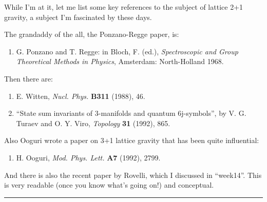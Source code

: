 \documentclass{article}
\def\tightlist{}
\renewcommand{\texttt}[1]{%
  \begingroup
  \ttfamily
  \begingroup\lccode`~=`/\lowercase{\endgroup\def~}{/\discretionary{}{}{}}%
  \begingroup\lccode`~=`[\lowercase{\endgroup\def~}{[\discretionary{}{}{}}%
  \begingroup\lccode`~=`.\lowercase{\endgroup\def~}{.\discretionary{}{}{}}%
  \catcode`/=\active\catcode`[=\active\catcode`.=\active
  \scantokens{#1\noexpand}%
  \endgroup
}
\begin{document}
While I'm at it, let me list some key references to the subject of
lattice 2+1 gravity, a subject I'm fascinated by these days.

The grandaddy of the all, the Ponzano-Regge paper, is:

\begin{enumerate}
\def\labelenumi{\arabic{enumi})}
\setcounter{enumi}{5}
\tightlist
\item
  G. Ponzano and T. Regge: in Bloch, F. (ed.), \emph{Spectroscopic and
  Group Theoretical Methods in Physics}, Amsterdam: North-Holland 1968.
\end{enumerate}

Then there are:

\begin{enumerate}
\def\labelenumi{\arabic{enumi})}
\setcounter{enumi}{6}
\item
  E. Witten, \emph{Nucl. Phys.} \textbf{B311} (1988), 46.
\item
  ``State sum invariants of 3-manifolds and quantum 6j-symbols'', by V.
  G. Turaev and O. Y. Viro, \emph{Topology} \textbf{31} (1992), 865.
\end{enumerate}

Also Ooguri wrote a paper on 3+1 lattice gravity that has been quite
influential:

\begin{enumerate}
\def\labelenumi{\arabic{enumi})}
\setcounter{enumi}{8}
\tightlist
\item
  H. Ooguri, \emph{Mod. Phys. Lett.} \textbf{A7} (1992), 2799.
\end{enumerate}

And there is also the recent paper by Rovelli, which I discussed in
``week14''. This is very readable (once you know what's going on!) and
conceptual.

\begin{center}\rule{0.5\linewidth}{0.5pt}\end{center}

\end{document}
